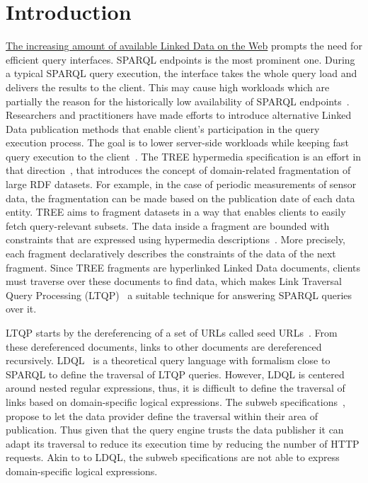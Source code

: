 \section{Introduction}



\href{https://lod-cloud.net/#diagram}{The increasing amount of available Linked Data on the Web} prompts the need for efficient query interfaces.
SPARQL endpoints is the most prominent one.
During a typical SPARQL query execution, the interface takes the whole query load and delivers the results to the client.
This may cause high workloads which are partially the reason for the historically low availability of SPARQL endpoints~\cite{aranda2013}.
Researchers and practitioners have made efforts to introduce alternative Linked Data publication methods that enable client's participation in the query execution process.
The goal is to lower server-side workloads while keeping fast query execution to the client~\cite{Azzam2021}.
The TREE hypermedia specification is an effort in that direction~\cite{ColpaertMaterializedTREE, lancker2021LDS}, that introduces the concept of domain-related fragmentation of large RDF datasets.
For example, in the case of periodic measurements of sensor data, the fragmentation can be made based on the publication date of each data entity.
TREE aims to fragment datasets in a way that enables clients to easily fetch query-relevant subsets.
The data inside a fragment are bounded with constraints that are expressed using hypermedia descriptions~\cite{thomasFieldingPhdThesis}.
More precisely, each fragment declaratively describes the constraints of the data of the next fragment.
Since TREE fragments are hyperlinked Linked Data documents,
clients must traverse over these documents to find data,
which makes Link Traversal Query Processing (LTQP)~\cite{Hartig2016} a suitable technique for answering SPARQL queries over it.

LTQP starts by the dereferencing of a set of URLs called seed URLs~\cite{Hartig2016}.
From these dereferenced documents, links to other documents are dereferenced recursively.
LDQL~\cite{hartig2016Ldql} is a theoretical query language with formalism close to SPARQL to define the traversal of LTQP queries.
However, LDQL is centered around nested regular expressions, thus, it is difficult to define the traversal of links based on domain-specific logical expressions.
The subweb specifications~\cite{bogaerts_rulemlrr_2021}, propose to let the data provider define the traversal within their area of publication.
Thus given that the query engine trusts the data publisher it can adapt its traversal to reduce its execution time by reducing the number of HTTP requests.
Akin to to LDQL, the subweb specifications are not able to express domain-specific logical expressions.

